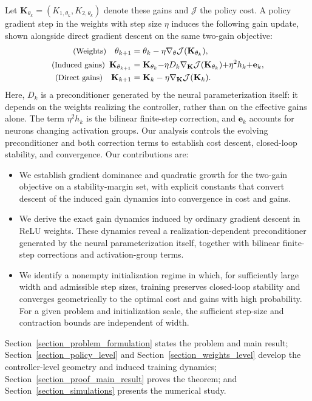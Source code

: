\documentclass[letterpaper, 10 pt, conference]{ieeeconf}
\newcommand{\be}{\mathbf{e}}
\newcommand{\bK}{\mathbf{K}}
\newcommand{\cJ}{\mathcal{J}}
\newcommand{\Sect}{Section}
\begin{document}
Let $\bK_{\theta_k}=(K_{1,\theta_k},K_{2,\theta_k})$ denote these gains and $\cJ$ the policy cost. A policy gradient step in the weights with step size $\eta$ induces the following gain update, shown alongside direct gradient descent on the same two-gain objective:
\begin{align*}
\text{\small (Weights)} \quad
 \theta_{k+1}
  &= \theta_k-\eta\nabla_{\theta}\cJ(\bK_{\theta_k}), \\
\text{\small (Induced gains)} \quad
 \!\!\!\bK_{\theta_{k+1}}
  &= \bK_{\theta_k}
  {-}\eta D_k\nabla_{\bK}\cJ(\bK_{\theta_k})
  {+}\eta^2h_k{+}\be_k, \\
\text{\small (Direct gains)} \quad
 \bK_{k+1}
 &= \bK_k-\eta\nabla_{\bK}\cJ(\bK_k).
\end{align*}
Here, $D_k$ is a preconditioner generated by the neural parameterization itself: it depends on the weights realizing the controller, rather than on the effective gains alone. The term $\eta^2h_k$ is the bilinear finite-step correction, and $\be_k$ accounts for neurons changing activation groups. Our analysis controls the evolving preconditioner and both correction terms to establish cost descent, closed-loop stability, and convergence. Our contributions are:
\begin{itemize}[leftmargin=2.0em,left=-1pt,itemsep=1pt, parsep=-1pt, topsep=-0pt, partopsep=-1pt]
\item We establish gradient dominance and quadratic growth for the two-gain objective on a stability-margin set, with explicit constants that convert descent of the induced gain dynamics into convergence in cost and gains.
\item We derive the exact gain dynamics induced by ordinary gradient descent in ReLU weights. These dynamics reveal a realization-dependent preconditioner generated by the neural parameterization itself, together with bilinear finite-step corrections and activation-group terms.
\item We identify a nonempty initialization regime in which, for sufficiently large width and admissible step sizes, training preserves closed-loop stability and converges geometrically to the optimal cost and gains with high probability. For a given problem and initialization scale, the sufficient step-size and contraction bounds are independent of width.
\end{itemize}

\noindent \Sect~\ref{section_problem_formulation} states the problem and main result; \Sect~\ref{section_policy_level} and \Sect~\ref{section_weights_level} develop the controller-level geometry and induced training dynamics; \Sect~\ref{section_proof_main_result} proves the theorem; and \Sect~\ref{section_simulations} presents the numerical study.
\end{document}
